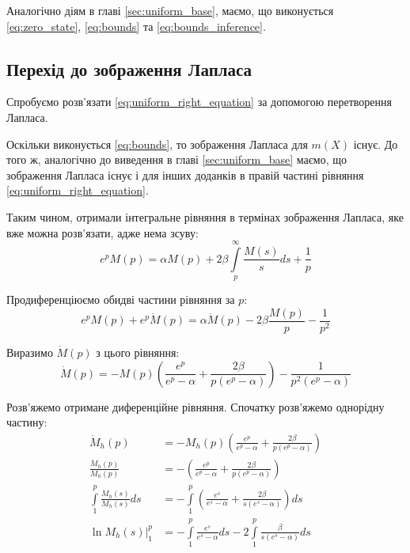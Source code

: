 Аналогічно діям в главі \ref{sec:uniform_base}, маємо, що виконується \eqref{eq:zero_state}, \eqref{eq:bounds} та \eqref{eq:bounds_inference}.

\subsection{Перехід до зображення Лапласа}
\label{sec:uniform_right_integral_laplace}

Спробуємо розв'язати \eqref{eq:uniform_right_equation} за допомогою перетворення Лапласа.

Оскільки виконується \eqref{eq:bounds}, то зображення Лапласа для $m(X)$ існує. До того ж, аналогічно до виведення в главі \ref{sec:uniform_base} маємо, що зображення Лапласа існує і для інших доданків в правій частині рівняння \eqref{eq:uniform_right_equation}.

Таким чином, отримали інтегральне рівняння в термінах зображення Лапласа, яке вже можна розв'язати, адже нема зсуву:
\begin{equation}
	\label{eq:uniform_right_laplace_integral}
	e^p M(p) = \alpha M(p) + 2\beta \int\limits_p^\infty \frac{M(s)}{s} ds + \frac{1}{p}
\end{equation}

Продиференціюємо обидві частини рівняння за $p$:
\begin{equation}
	e^p M(p) + e^p \dot M(p) =\alpha \dot M(p) - 2 \beta \frac{M(p)}{p}  - \frac1{p^2}
\end{equation}

Виразимо $\dot M(p)$ з цього рівняння:
\begin{equation}
	\label{eq:uniform_right_laplace_diff}
	\dot M(p) = - M(p)\left(\frac{e^p}{e^p - \alpha} + \frac{2\beta}{p(e^p - \alpha)}\right) - \frac{1}{p^2(e^p - \alpha)}
\end{equation}

Розв'яжемо отримане диференційне рівняння. Спочатку розв'яжемо однорідну частину:
\begin{align*}
	\dot M_h (p) &= - M_h (p)\left(\frac{e^p}{e^p - \alpha} + \frac{2\beta}{p(e^p - \alpha)}\right) \\
	\frac{\dot M_h (p)}{M_h (p)} &= -\left(\frac{e^p}{e^p - \alpha} + \frac{2\beta}{p(e^p - \alpha)}\right) \\
	\int\limits_1^p \frac{\dot M_h (s)}{M_h (s)} ds &= -\int\limits_1^p \left(\frac{e^s}{e^s - \alpha} + \frac{2\beta}{s(e^s - \alpha)}\right) ds \\
	\left. \ln{M_h (s)}\right|_1^p &= - \int\limits_1^p \frac{e^s}{e^s - \alpha} ds  - 2 \int\limits_1^p \frac{\beta}{s(e^s - \alpha)} ds
\end{align*}

